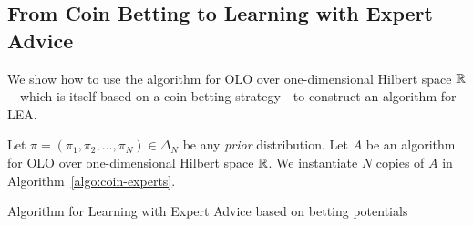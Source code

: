 \subsection{From Coin Betting to Learning with Expert Advice}
\label{section:reduction-experts}

We show how to use the algorithm for OLO over one-dimensional Hilbert space $\mathbb{R}$---which is itself
based on a coin-betting strategy---to construct an algorithm for \ac{LEA}.

Let $\pi = (\pi_1, \pi_2, \dots, \pi_N) \in \Delta_N$ be
any \emph{prior} distribution. Let $A$ be an algorithm for OLO over
one-dimensional Hilbert space $\mathbb{R}$. We instantiate $N$ copies of $A$ in Algorithm~\ref{algo:coin-experts}.

\begin{algorithm}[t]
\begin{algorithmic}
\caption{Algorithm for Learning with Expert Advice based on betting potentials
\label{algo:coin-experts}}
{
\ENDFOR
}
\end{algorithmic}
\end{algorithm}

